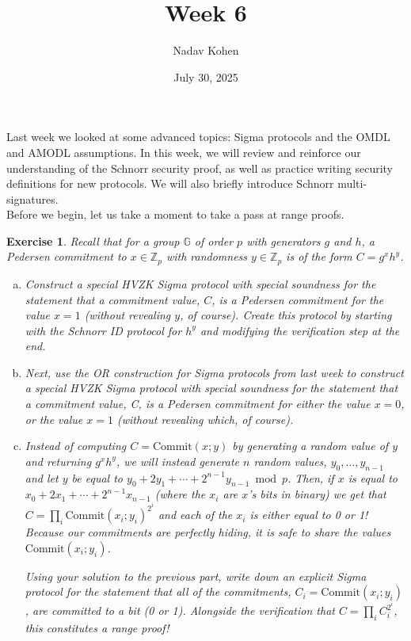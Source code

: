 \documentclass[12pt]{article}
\newcommand{\Z}[0]{\mathbb{Z}}
\newcommand{\G}[0]{\mathbb{G}}
\newtheorem{exercise}{Exercise}
\theoremstyle{definition}
\theoremstyle{remark}
\theoremstyle{definition}
\begin{document}
\title{Week 6}
\author{Nadav Kohen}
\date{July 30, 2025}
\maketitle

Last week we looked at some advanced topics: Sigma protocols and the OMDL and AMODL assumptions. In this week, we will review and reinforce our understanding of the Schnorr security proof, as well as practice writing security definitions for new protocols. We will also briefly introduce Schnorr multi-signatures.\\

Before we begin, let us take a moment to take a pass at range proofs.

\begin{exercise} Recall that for a group $\G$ of order $p$ with generators  $g$ and $h$, a Pedersen commitment to $x\in\Z_p$ with randomness $y\in\Z_p$ is of the form $C = g^xh^y$.
\begin{enumerate}[(a)]
\item Construct a special HVZK Sigma protocol with special soundness for the statement that a commitment value, $C$, is a Pedersen commitment for the value $x = 1$ (without revealing $y$, of course). Create this protocol by starting with the Schnorr ID protocol for $h^y$ and modifying the verification step at the end.
\item Next, use the OR construction for Sigma protocols from last week to construct a special HVZK Sigma protocol with special soundness for the statement that a commitment value, C, is a Pedersen commitment for either the value $x = 0$, or the value $x = 1$ (without revealing which, of course).
\item Instead of computing $C = \text{Commit}(x; y)$ by generating a random value of $y$ and returning $g^xh^y$, we will instead generate $n$ random values, $y_0, \ldots, y_{n-1}$ and let $y$ be equal to $y_0 + 2y_1 + \cdots + 2^{n-1}y_{n-1}\bmod p$. Then, if $x$ is equal to $x_0 + 2x_1 + \cdots + 2^{n-1}x_{n-1}$ (where the $x_i$ are $x$’s bits in binary) we get that $C = \prod_i \text{Commit}(x_i; y_i)^{2^i}$ and each of the $x_i$ is either equal to 0 or 1! Because our commitments are perfectly hiding, it is safe to share the values $\text{Commit}(x_i; y_i)$.

Using your solution to the previous part, write down an explicit Sigma protocol for the statement that all of the commitments, $C_i = \text{Commit}(x_i; y_i)$, are committed to a bit (0 or 1). Alongside the verification that $C = \prod_i C_i^{2^i}$, this constitutes a range proof!
\end{enumerate}
\end{exercise}
\end{document}
